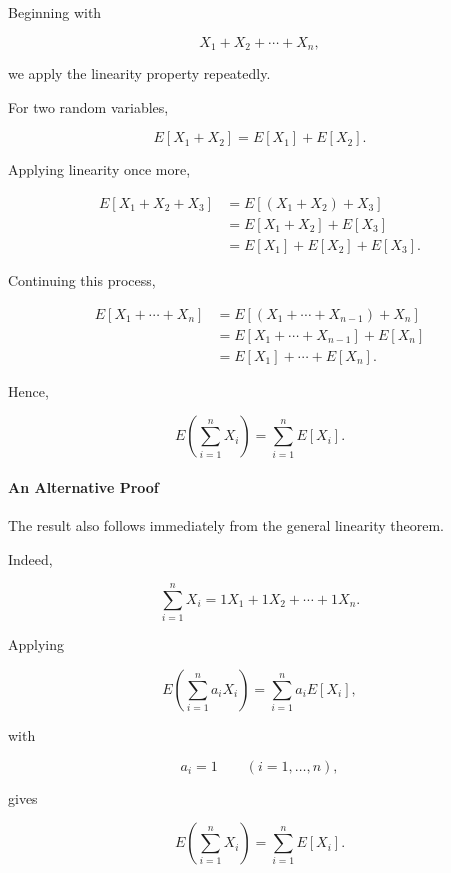 \documentclass[11pt]{article}
\begin{document}
\begin{mdframed}[
		linewidth=0.8pt,
		roundcorner=6pt,
		backgroundcolor=gray!5,
		linecolor=gray!60,
		innertopmargin=10pt,
		innerbottommargin=10pt,
		innerleftmargin=10pt,
		innerrightmargin=10pt
		]
		Beginning with
		
		\[
		X_1+X_2+\cdots+X_n,
		\]
		
		we apply the linearity property repeatedly.
		
		For two random variables,
		
		\[
		E[X_1+X_2]
		=
		E[X_1]
		+
		E[X_2].
		\]
		
		Applying linearity once more,
		
		\[
		\begin{aligned}
			E[X_1+X_2+X_3]
			&=
			E[(X_1+X_2)+X_3]
			\\[0.3cm]
			&=
			E[X_1+X_2]
			+
			E[X_3]
			\\[0.3cm]
			&=
			E[X_1]
			+
			E[X_2]
			+
			E[X_3].
		\end{aligned}
		\]
		
		Continuing this process,
		
		\[
		\begin{aligned}
			E[X_1+\cdots+X_n]
			&=
			E[(X_1+\cdots+X_{n-1})+X_n]
			\\[0.3cm]
			&=
			E[X_1+\cdots+X_{n-1}]
			+
			E[X_n]
			\\[0.3cm]
			&=
			E[X_1]
			+\cdots+
			E[X_n].
		\end{aligned}
		\]
		
		Hence,
		
		\[
		\boxed{
			E\!\left(
			\sum_{i=1}^{n}X_i
			\right)
			=
			\sum_{i=1}^{n}E[X_i].
		}
		\]
		
		\bigskip
		
		\paragraph{An Alternative Proof}
		
		The result also follows immediately from the general linearity theorem.
		
		Indeed,
		
		\[
		\sum_{i=1}^{n}X_i
		=
		1X_1
		+
		1X_2
		+\cdots+
		1X_n.
		\]
		
		Applying
		
		\[
		E\!\left(
		\sum_{i=1}^{n}
		a_iX_i
		\right)
		=
		\sum_{i=1}^{n}
		a_iE[X_i],
		\]
		
		with
		
		\[
		a_i=1
		\qquad
		(i=1,\ldots,n),
		\]
		
		gives
		
		\[
		E\!\left(
		\sum_{i=1}^{n}X_i
		\right)
		=
		\sum_{i=1}^{n}E[X_i].
		\]
		

\end{mdframed}
\end{document}
